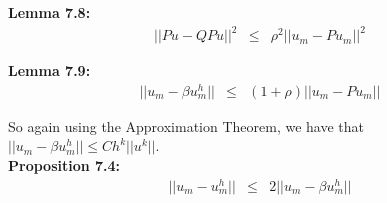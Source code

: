 \documentclass[../../main.tex]{subfiles}
\begin{document}
\textbf{Lemma 7.8:}
\begin{eqnarray*}
||Pu - QPu||^{2} &\leq & {\rho}^{2} ||u_{m} - Pu_{m}||^{2}
\end{eqnarray*}

\begin{comment}
\textbf{Proof:}

Now using Lemma 7.7:
\begin{eqnarray*}
||Pu - \beta u_{m}^{h}||^{2} &=& \sum_{j\neq m} \left(\frac{\lambda_{m}}{|\lambda_{m} - \lambda_{j}^{h}|}\right)^{2} ( u_{m} - Pu_{m} ,u_{j}^{h})^{2}\\
				&\leq & \rho^{2} \sum_{j\neq m} ( u_{m} - Pu_{m} ,u_{j}^{h})^{2} \\
				&\leq & \rho^{2} \sum_{j=1}^{N} ( u_{m} - Pu_{m} ,u_{j}^{h})^{2} \\
				& = & \rho^{2} ||u - Pu||^{2}\\
\end{eqnarray*}
\qed
\end{comment}

\textbf{Lemma 7.9:}
\begin{eqnarray*}
||u_{m} - \beta u_{m}^{h}|| &\leq & \left(1+\rho\right)||u_{m}-Pu_{m}||
\end{eqnarray*}

\begin{comment}
\textbf{Proof:}
\begin{eqnarray*}
||u_{m} - \beta u_{m}^{h}|| & \leq & ||u_{m}-Pu_{m}|| + ||Pu_{m} - \beta u_{m}^{h}|| \\
			& \leq & \left(1+\rho\right)||u_{m}-Pu_{m}|| \ \ \textrm{ (by Lemma 7.8)}
\end{eqnarray*}
\qed
\end{comment}



So again using the Approximation Theorem, we have that $||u_{m} - \beta u_{m}^{h}||\leq Ch^{k}||u^{k}||$.\\


\textbf{Proposition 7.4:}
\begin{eqnarray*}
||u_{m} -  u_{m}^{h}|| &\leq & 2||u_{m}-\beta u^{h}_{m}||
\end{eqnarray*}

\begin{comment}
\textbf{Proof:}
\begin{eqnarray*}
||u_{m} - u_{m}^{h}|| &=& ||u_{m} - \beta u_{m}^{h} + \beta u_{m}^{h} - u_{m}^{h}|| \\
					& \leq & ||u_{m} - \beta u_{m}^{h}|| + ||\beta u_{m}^{h} - u_{m}^{h}|| \\
					& = & 2||u_{m} - \beta u_{m}^{h}||	
\end{eqnarray*}
\qed
\end{comment}
\end{document}
